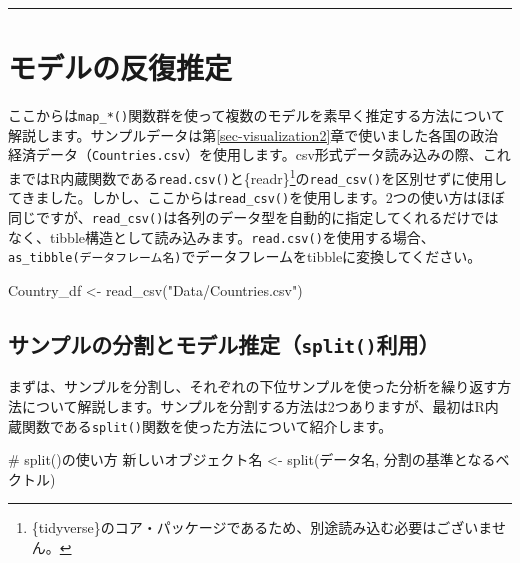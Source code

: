 \documentclass[
  a4paper,
  pandoc,
  ja=standard,
  jafont=haranoaji]{bxjsbook}
\newenvironment{Shaded}{\begin{snugshade}}{\end{snugshade}}
\newcommand{\CommentTok}[1]{\textcolor[rgb]{0.37,0.37,0.37}{#1}}
\newcommand{\FunctionTok}[1]{\textcolor[rgb]{0.28,0.35,0.67}{#1}}
\newcommand{\NormalTok}[1]{\textcolor[rgb]{0.00,0.48,0.65}{#1}}
\newcommand{\OtherTok}[1]{\textcolor[rgb]{0.00,0.48,0.65}{#1}}
\newcommand{\StringTok}[1]{\textcolor[rgb]{0.13,0.47,0.30}{#1}}
\begin{document}
\begin{center}\rule{0.5\linewidth}{0.5pt}\end{center}

\hypertarget{sec-iteration_model1}{%
\section{モデルの反復推定}\label{sec-iteration_model1}}

ここからは\texttt{map\_*()}関数群を使って複数のモデルを素早く推定する方法について解説します。サンプルデータは第\ref{sec-visualization2}章で使いました各国の政治経済データ（\texttt{Countries.csv}）を使用します。csv形式データ読み込みの際、これまではR内蔵関数である\texttt{read.csv()}と\{readr\}\footnote{\{tidyverse\}のコア・パッケージであるため、別途読み込む必要はございません。}の\texttt{read\_csv()}を区別せずに使用してきました。しかし、ここからは\texttt{read\_csv()}を使用します。2つの使い方はほぼ同じですが、\texttt{read\_csv()}は各列のデータ型を自動的に指定してくれるだけではなく、tibble構造として読み込みます。\texttt{read.csv()}を使用する場合、\texttt{as\_tibble(データフレーム名)}でデータフレームをtibbleに変換してください。

\begin{Shaded}
\begin{Highlighting}[numbers=left,,]
\NormalTok{Country\_df }\OtherTok{\textless{}{-}} \FunctionTok{read\_csv}\NormalTok{(}\StringTok{"Data/Countries.csv"}\NormalTok{)}
\end{Highlighting}
\end{Shaded}

\hypertarget{sec-iteration_split1}{%
\subsection{\texorpdfstring{サンプルの分割とモデル推定（\texttt{split()}利用）}{サンプルの分割とモデル推定（split()利用）}}\label{sec-iteration_split1}}

まずは、サンプルを分割し、それぞれの下位サンプルを使った分析を繰り返す方法について解説します。サンプルを分割する方法は2つありますが、最初はR内蔵関数である\texttt{split()}関数を使った方法について紹介します。

\begin{Shaded}
\begin{Highlighting}[numbers=left,,]
\CommentTok{\# split()の使い方}
\NormalTok{新しいオブジェクト名 }\OtherTok{\textless{}{-}} \FunctionTok{split}\NormalTok{(データ名, 分割の基準となるベクトル)}
\end{Highlighting}
\end{Shaded}
\end{document}
